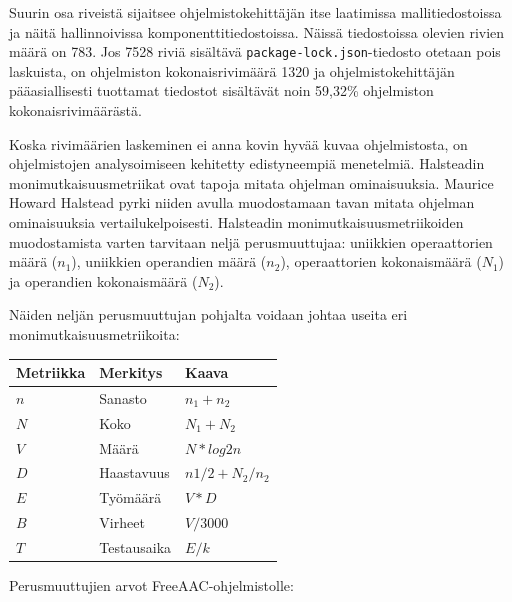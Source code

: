 \documentclass[utf8]{gradu3}
\begin{document}
Suurin osa riveistä sijaitsee ohjelmistokehittäjän itse laatimissa mallitiedostoissa ja näitä hallinnoivissa komponenttitiedostoissa. Näissä tiedostoissa olevien rivien määrä on 783. Jos 7528 riviä sisältävä \texttt{package-lock.json}-tiedosto otetaan pois laskuista, on ohjelmiston kokonaisrivimäärä 1320 ja ohjelmistokehittäjän pääasiallisesti tuottamat tiedostot sisältävät noin 59,32\% ohjelmiston kokonaisrivimäärästä.

Koska rivimäärien laskeminen ei anna kovin hyvää kuvaa ohjelmistosta, on ohjelmistojen analysoimiseen kehitetty edistyneempiä menetelmiä. Halsteadin monimutkaisuusmetriikat ovat tapoja mitata ohjelman ominaisuuksia. Maurice Howard Halstead pyrki niiden avulla muodostamaan tavan mitata ohjelman ominaisuuksia vertailukelpoisesti. Halsteadin monimutkaisuusmetriikoiden muodostamista varten tarvitaan neljä perusmuuttujaa: uniikkien operaattorien määrä ($n_1$), uniikkien operandien määrä ($n_2$), operaattorien kokonaismäärä ($N_1$) ja operandien kokonaismäärä ($N_2$).

Näiden neljän perusmuuttujan pohjalta voidaan johtaa useita eri monimutkaisuusmetriikoita:

\begin{center}
    \begin{tabular}{ | l | l | l |}
    \hline
    \textbf{Metriikka} & \textbf{Merkitys} & \textbf{Kaava} \\ \hline
    $n$ & Sanasto & $n_1 + n_2$ \\ \hline
    $N$ & Koko & $N_1 + N_2$ \\ \hline
    $V$ & Määrä & $N * log2 n$ \\ \hline
    $D$ & Haastavuus & $n1/2 + N_2/n_2$ \\ \hline
    $E$ & Työmäärä & $V * D$ \\ \hline
    $B$ & Virheet & $V / 3000$ \\ \hline
    $T$ & Testausaika & $E / k$ \\ \hline
    \end{tabular}
\end{center}

Perusmuuttujien arvot FreeAAC-ohjelmistolle:
\end{document}
